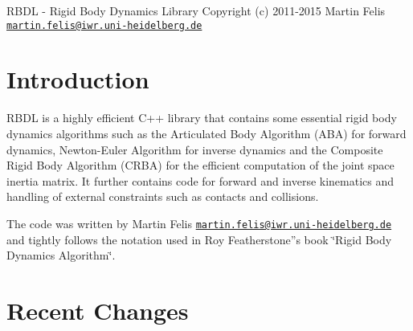 R\+B\+D\+L -\/ Rigid Body Dynamics Library Copyright (c) 2011-\/2015 Martin Felis \href{mailto:martin.felis@iwr.uni-heidelberg.de}{\tt martin.\+felis@iwr.\+uni-\/heidelberg.\+de}

\section*{Introduction }

R\+B\+D\+L is a highly efficient C++ library that contains some essential rigid body dynamics algorithms such as the Articulated Body Algorithm (A\+B\+A) for forward dynamics, Newton-\/\+Euler Algorithm for inverse dynamics and the Composite Rigid Body Algorithm (C\+R\+B\+A) for the efficient computation of the joint space inertia matrix. It further contains code for forward and inverse kinematics and handling of external constraints such as contacts and collisions.

The code was written by Martin Felis \href{mailto:martin.felis@iwr.uni-heidelberg.de}{\tt martin.\+felis@iwr.\+uni-\/heidelberg.\+de} and tightly follows the notation used in Roy Featherstone''s book \char`\"{}\+Rigid
\+Body Dynamics Algorithm\char`\"{}.

\section*{Recent Changes }


